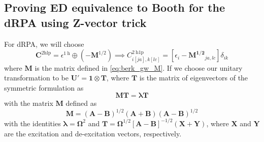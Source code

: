 \subsection{Proving ED equivalence to Booth for the dRPA using Z-vector trick}
For dRPA, we will choose 
\begin{equation}
    \bm{C}^{2 \mathrm{hlp}} = \epsilon^{1 \mathrm{~h}} \oplus (-\bm{M}^{1/2})
\implies C_{i[j a], k[l c]}^{2 \mathrm{~h} 1 \mathrm{p}} = \left[\epsilon _i - \bm{M^{1/2}}_{ja,lc}\right] \delta_{i k}
\end{equation}
 where $\bm{M}$ is the matrix defined in \eqref{eq:berk_gw_M}.
If we choose our unitary transformation to be $\bm{U'} = \bm{1} \otimes \bm{T}$, where $\bm{T}$ is the matrix of eigenvectors of the symmetric formulation as 
\begin{equation}
    \bm{M}\bm{T}= \bm{\lambda } \bm{T}
\label{eq:berk_gw_eigenproblem}
\end{equation}
with the matrix $\bm{M}$ defined as
\begin{equation}
    \bm{M}=(\bm{A}-\bm{B})^{1 / 2}(\bm{A}+\bm{B})(\bm{A}-\bm{B})^{1 / 2}
\label{eq:berk_gw_M}
\end{equation}
with the identities $\bm{\lambda } = \bm{\Omega }^2$ and $\bm{T} = \bm{\Omega }^{1/2} \left[\bm{A}-\bm{B}\right]^{-1/2}\left(\bm{X} + \bm{Y}\right)$, where $\bm{X}$ and $\bm{Y}$ are the excitation and de-excitation vectors, respectively. 

